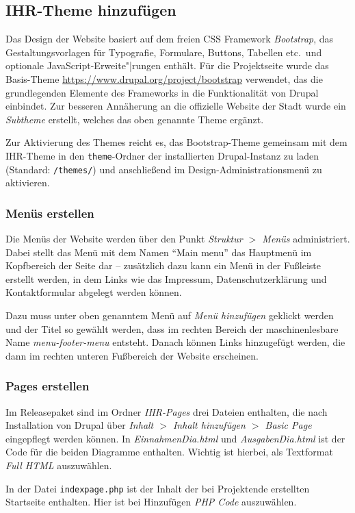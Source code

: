 \documentclass[a4paper,11pt,twoside]{article}
\begin{document}
\subsection{IHR-Theme hinzufügen}
Das Design der Website basiert auf dem freien CSS Framework \emph{Bootstrap},
das Gestaltungsvorlagen für Typografie, Formulare, Buttons, Tabellen etc.\ und
optionale JavaScript-Erweite"|rungen enthält. Für die Projektseite wurde das
Basis-Theme \url{https://www.drupal.org/project/bootstrap} verwendet, das die
grundlegenden Elemente des Frameworks in die Funktionalität von Drupal
einbindet.  Zur besseren Annäherung an die offizielle Website der Stadt wurde
ein \emph{Subtheme} erstellt, welches das oben genannte Theme ergänzt.

Zur Aktivierung des Themes reicht es, das Bootstrap-Theme gemeinsam mit dem
IHR-Theme in den \texttt{theme}-Ordner der installierten Drupal-Instanz zu
laden (Standard: \texttt{/themes/}) und anschließend im
Design-Administrationsmenü zu aktivieren.

\subsubsection{Menüs erstellen}
Die Menüs der Website werden über den Punkt \textit{Struktur $>$ Menüs}
administriert. Dabei stellt das Menü mit dem Namen "`Main menu"' das Hauptmenü
im Kopfbereich der Seite dar -- zusätzlich dazu kann ein Menü in der Fußleiste
erstellt werden, in dem Links wie das Impressum, Datenschutzerklärung und
Kontaktformular abgelegt werden können.

Dazu muss unter oben genanntem Menü auf \emph{Menü hinzufügen} geklickt werden
und der Titel so gewählt werden, dass im rechten Bereich der maschinenlesbare
Name \textit{menu-footer-menu} entsteht. Danach können Links hinzugefügt
werden, die dann im rechten unteren Fußbereich der Website erscheinen.

\subsubsection{Pages erstellen}
Im Releasepaket sind im Ordner \emph{IHR-Pages} drei Dateien enthalten, die
nach Installation von Drupal über \textit{Inhalt $>$ Inhalt hinzufügen $>$
  Basic Page} eingepflegt werden können. In \textit{EinnahmenDia.html} und
\textit{AusgabenDia.html} ist der Code für die beiden Diagramme enthalten.
Wichtig ist hierbei, als Textformat \emph{Full HTML} auszuwählen.

In der Datei \texttt{indexpage.php} ist der Inhalt der bei Projektende
erstellten Startseite enthalten. Hier ist bei Hinzufügen \emph{PHP Code}
auszuwählen.
\end{document}
